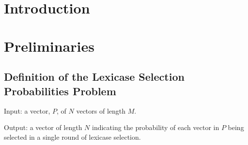\documentclass[sigconf]{acmart}
\begin{document}


\maketitle

\section{Introduction}



\section{Preliminaries}

\subsection{Definition of the Lexicase Selection Probabilities Problem}

\begin{definition}
Input: a vector, $P$, of $N$ vectors of length $M$. 

Output: a vector of length $N$ indicating the probability of each vector in $P$ being selected in a single round of lexicase selection.
\end{definition}
\end{document}
